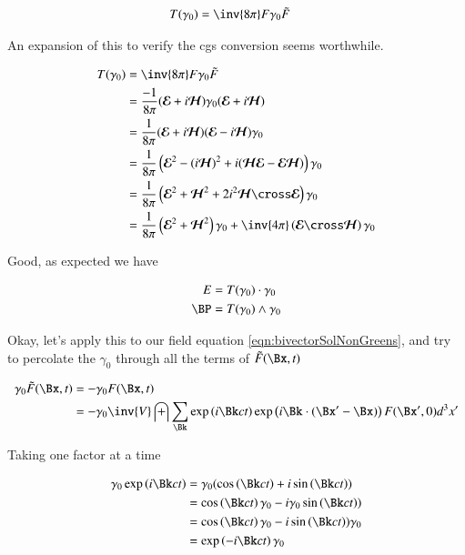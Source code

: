 \documentclass{article}
\newcommand{\EE}[0]{\boldsymbol{\mathcal{E}}}
\newcommand{\HH}[0]{\boldsymbol{\mathcal{H}}}
\begin{document}
\begin{align}
T(\gamma_0) &= \inv{8\pi} F \gamma_0 \tilde{F}
\end{align}

An expansion of this to verify the cgs conversion seems worthwhile.

\begin{align*}
T(\gamma_0) 
&= \inv{8\pi} F \gamma_0 \tilde{F} \\
&= \frac{-1}{8\pi} (\EE + i\HH) \gamma_0 (\EE + i\HH) \\
&= \frac{1}{8\pi} (\EE + i\HH) (\EE - i\HH) \gamma_0 \\
&= \frac{1}{8\pi} \left( \EE^2 - (i\HH)^2 + i(\HH \EE - \EE \HH) \right) \gamma_0 \\
&= \frac{1}{8\pi} \left( \EE^2 + \HH^2 + 2 i^2 \HH \cross \EE \right) \gamma_0 \\
&= \frac{1}{8\pi} \left( \EE^2 + \HH^2 \right) \gamma_0 + \inv{4 \pi} \left(\EE \cross \HH \right) \gamma_0 \\
\end{align*}

Good, as expected we have 

\begin{align}
E &= T(\gamma_0) \cdot \gamma_0 \\
\BP &= T(\gamma_0) \wedge \gamma_0
\end{align}

Okay, let's apply this to our field equation \ref{eqn:bivectorSolNonGreens}, and try to percolate the $\gamma_0$ through all the terms
of $\tilde{F}(\Bx,t)$

\begin{align*}
\gamma_0 \tilde{F}(\Bx,t) 
&= -\gamma_0 F(\Bx,t) \\
&= -\gamma_0 \inv{V} \int \sum_{\Bk} \exp\left( i \Bk ct \right) \exp\left( i \Bk \cdot (\Bx' -\Bx) \right) F(\Bx', 0) d^3 x' \\
\end{align*}

Taking one factor at a time 

\begin{align*}
\gamma_0 \exp\left( i \Bk ct \right) 
&= \gamma_0 (\cos\left( \Bk ct \right) + i \sin\left( \Bk ct \right) ) \\
&= \cos\left( \Bk ct \right) \gamma_0 - i \gamma_0 \sin\left( \Bk ct \right) ) \\
&= \cos\left( \Bk ct \right) \gamma_0 - i \sin\left( \Bk ct \right) ) \gamma_0 \\
&= \exp\left( -i \Bk ct \right) \gamma_0
\end{align*}
\end{document}
